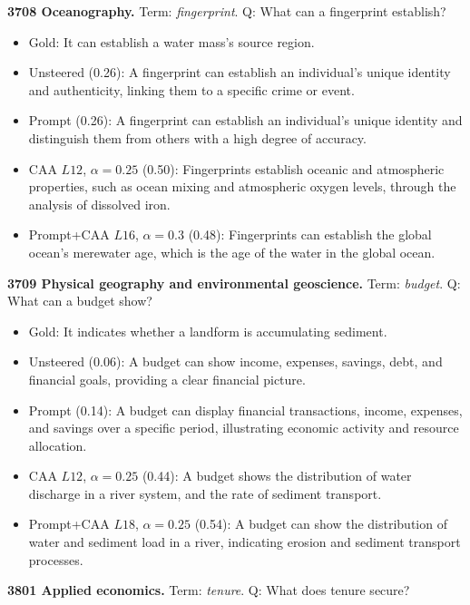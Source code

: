 \medskip\noindent\textbf{3708 Oceanography.} Term: \emph{fingerprint}.
Q: What can a fingerprint establish?
\begin{itemize}\setlength{\itemsep}{0.15em}\setlength{\parsep}{0pt}\setlength{\topsep}{0.2em}
\item Gold: It can establish a water mass's source region.
\item Unsteered (0.26): A fingerprint can establish an individual's unique identity and authenticity, linking them to a specific crime or event.
\item Prompt (0.26): A fingerprint can establish an individual's unique identity and distinguish them from others with a high degree of accuracy.
\item CAA $L12$, $\alpha=0.25$ (0.50): Fingerprints establish oceanic and atmospheric properties, such as ocean mixing and atmospheric oxygen levels, through the analysis of dissolved iron.
\item Prompt+CAA $L16$, $\alpha=0.3$ (0.48): Fingerprints can establish the global ocean's merewater age, which is the age of the water in the global ocean.
\end{itemize}
\medskip\noindent\textbf{3709 Physical geography and environmental geoscience.} Term: \emph{budget}.
Q: What can a budget show?
\begin{itemize}\setlength{\itemsep}{0.15em}\setlength{\parsep}{0pt}\setlength{\topsep}{0.2em}
\item Gold: It indicates whether a landform is accumulating sediment.
\item Unsteered (0.06): A budget can show income, expenses, savings, debt, and financial goals, providing a clear financial picture.
\item Prompt (0.14): A budget can display financial transactions, income, expenses, and savings over a specific period, illustrating economic activity and resource allocation.
\item CAA $L12$, $\alpha=0.25$ (0.44): A budget shows the distribution of water discharge in a river system, and the rate of sediment transport.
\item Prompt+CAA $L18$, $\alpha=0.25$ (0.54): A budget can show the distribution of water and sediment load in a river, indicating erosion and sediment transport processes.
\end{itemize}
\medskip\noindent\textbf{3801 Applied economics.} Term: \emph{tenure}.
Q: What does tenure secure?
